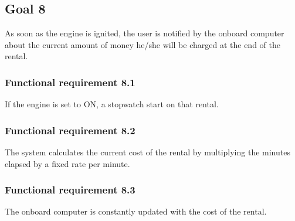 \subsection{Goal 8}
As soon as the engine is ignited, the user is notified by the onboard computer about the current amount of money he/she will be charged at the end of the rental.

\setcounter{secnumdepth}{3}
\subsubsection{Functional requirement 8.1}
If the engine is set to ON, a stopwatch start on that rental.

\subsubsection{Functional requirement 8.2}
The system calculates the current cost of the rental by multiplying the minutes elapsed by a fixed rate per minute.

\subsubsection{Functional requirement 8.3}
The onboard computer is constantly updated with the cost of the rental.